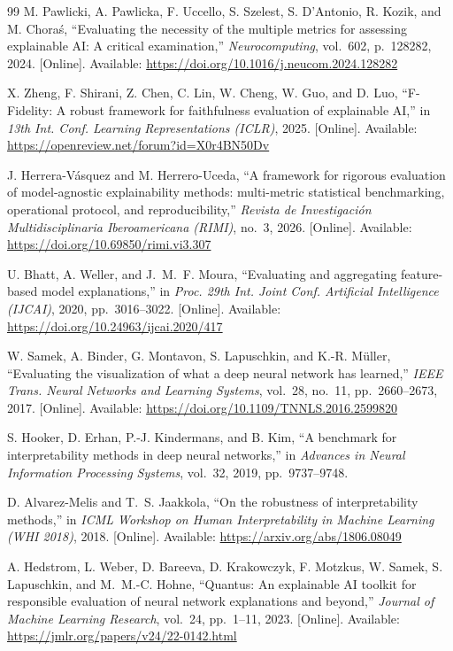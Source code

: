 \documentclass{cleiej}
\begin{document}
\begin{thebibliography}{99}
M. Pawlicki, A. Pawlicka, F. Uccello, S. Szelest, S. D'Antonio, R. Kozik,
and M. Chora\'{s}, ``Evaluating the necessity of the multiple metrics for
assessing explainable AI: A critical examination,'' \emph{Neurocomputing},
vol.~602, p.~128282, 2024. [Online]. Available:
\url{https://doi.org/10.1016/j.neucom.2024.128282}

X. Zheng, F. Shirani, Z. Chen, C. Lin, W. Cheng, W. Guo, and D. Luo,
``F-Fidelity: A robust framework for faithfulness evaluation of explainable
AI,'' in \emph{13th Int. Conf. Learning Representations (ICLR)}, 2025.
[Online]. Available: \url{https://openreview.net/forum?id=X0r4BN50Dv}

J. Herrera-V\'asquez and M. Herrero-Uceda, ``A framework for rigorous
evaluation of model-agnostic explainability methods: multi-metric
statistical benchmarking, operational protocol, and reproducibility,''
\emph{Revista de Investigaci\'on Multidisciplinaria Iberoamericana (RIMI)},
no.~3, 2026. [Online]. Available:
\url{https://doi.org/10.69850/rimi.vi3.307}

U. Bhatt, A. Weller, and J.~M.~F. Moura, ``Evaluating and aggregating
feature-based model explanations,'' in \emph{Proc. 29th Int. Joint Conf.
Artificial Intelligence (IJCAI)}, 2020, pp.~3016--3022. [Online]. Available:
\url{https://doi.org/10.24963/ijcai.2020/417}

W. Samek, A. Binder, G. Montavon, S. Lapuschkin, and K.-R. M\"{u}ller,
``Evaluating the visualization of what a deep neural network has learned,''
\emph{IEEE Trans. Neural Networks and Learning Systems}, vol.~28, no.~11,
pp.~2660--2673, 2017. [Online]. Available:
\url{https://doi.org/10.1109/TNNLS.2016.2599820}

S. Hooker, D. Erhan, P.-J. Kindermans, and B. Kim, ``A benchmark for
interpretability methods in deep neural networks,'' in \emph{Advances in
Neural Information Processing Systems}, vol.~32, 2019, pp.~9737--9748.

D. Alvarez-Melis and T.~S. Jaakkola, ``On the robustness of
interpretability methods,'' in \emph{ICML Workshop on Human
Interpretability in Machine Learning (WHI 2018)}, 2018. [Online].
Available: \url{https://arxiv.org/abs/1806.08049}

A. Hedstrom, L. Weber, D. Bareeva, D. Krakowczyk, F. Motzkus, W. Samek,
S. Lapuschkin, and M.~M.-C. Hohne, ``Quantus: An explainable AI toolkit for
responsible evaluation of neural network explanations and beyond,''
\emph{Journal of Machine Learning Research}, vol.~24, pp.~1--11, 2023. [Online]. Available:
\url{https://jmlr.org/papers/v24/22-0142.html}


\end{thebibliography}
\end{document}
